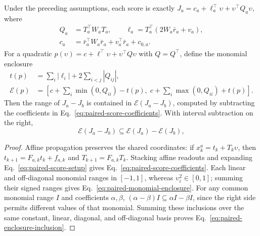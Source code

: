 \begin{proposition}
\label{prop:paired-candidate-enclosure}
Under the preceding assumptions, each score is exactly
$J_a=c_a+\ell_a^\top\upsilon+\upsilon^\top Q_a\upsilon$, where
\begin{equation}
 \begin{aligned}
 Q_a&=T_a^\top W_a T_a,\qquad
 \ell_a=T_a^\top(2W_a\bar r_a+v_a),\\
 c_a&=\bar r_a^\top W_a\bar r_a+v_a^\top\bar r_a+c_{0,a}.
 \end{aligned}
 \label{eq:paired-score-coefficients}
\end{equation}
For a quadratic $p(\upsilon)=c+\ell^\top\upsilon+\upsilon^\top Q\upsilon$
with $Q=Q^\top$, define the monomial enclosure
\begin{equation}
 \begin{aligned}
 t(p)&=\sum_i|\ell_i|+2\sum_{i<j}|Q_{ij}|,\\
 \mathcal E(p)&=
 \left[c+\sum_i\min(0,Q_{ii})-t(p),\;
       c+\sum_i\max(0,Q_{ii})+t(p)\right].
 \end{aligned}
 \label{eq:paired-monomial-enclosure}
\end{equation}
Then the range of $J_a-J_b$ is contained in
$\mathcal E(J_a-J_b)$, computed by subtracting the coefficients in
Eq.~\eqref{eq:paired-score-coefficients}. With interval subtraction on the right,
\begin{equation}
 \mathcal E(J_a-J_b)\subseteq\mathcal E(J_a)-\mathcal E(J_b),
 \label{eq:paired-enclosure-inclusion}
\end{equation}
\end{proposition}

\begin{proof}
Affine propagation preserves the shared coordinates: if
$x_k^a=t_k+T_k\upsilon$, then
$t_{k+1}=F_{a,k}t_k+f_{a,k}$ and $T_{k+1}=F_{a,k}T_k$.
Stacking affine readouts and expanding Eq.~\eqref{eq:paired-score-setup}
gives Eq.~\eqref{eq:paired-score-coefficients}.
Each linear and off-diagonal monomial ranges in $[-1,1]$, whereas
$\upsilon_i^2\in[0,1]$; summing their signed ranges gives
Eq.~\eqref{eq:paired-monomial-enclosure}.
For any common monomial range $I$ and coefficients $\alpha,\beta$,
$(\alpha-\beta)I\subseteq\alpha I-\beta I$, since the right side permits
different values of that monomial. Summing these inclusions over the same
constant, linear, diagonal, and off-diagonal basis proves
Eq.~\eqref{eq:paired-enclosure-inclusion}.
\end{proof}

